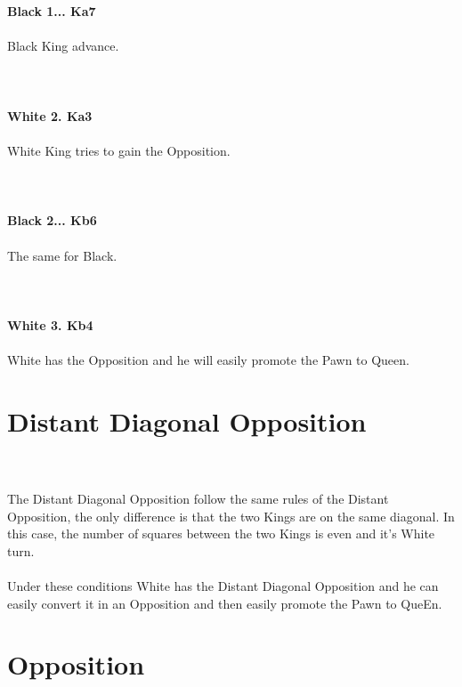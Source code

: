 \documentclass{article}
\begin{document}
\\
\\
\textbf{Black 1... Ka7}\\
\\
Black King advance.\\
\\

\\
\\
\textbf{White 2. Ka3}\\
\\
White King tries to gain the Opposition.\\
\\

\\
\\
\textbf{Black 2... Kb6}\\
\\
The same for Black.\\
\\

\\
\\
\textbf{White 3. Kb4}\\
\\
White has the Opposition and he will easily promote the Pawn to Queen.\section{ Distant Diagonal Opposition}

\\
\\
The Distant Diagonal Opposition follow the same rules of the Distant Opposition, the only difference is that the two Kings are on the same diagonal. In this case, the number of squares between the two Kings is even and it's White turn.\\\\Under these conditions White has the Distant Diagonal Opposition and he can easily convert it in an Opposition and then easily promote the Pawn to QueEn.\section{ Opposition}

\\
\\
\end{document}
